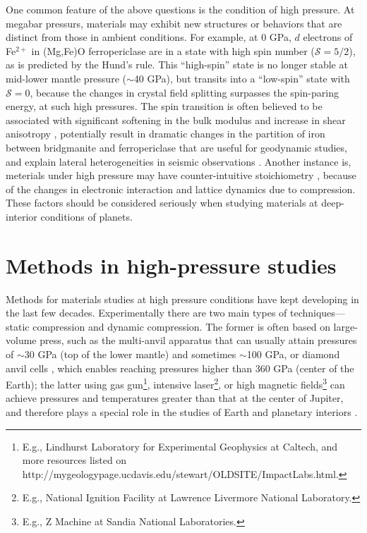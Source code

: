 One common feature of the above questions is the condition of high pressure. At megabar pressurs, materials may exhibit new structures or behaviors that are distinct from those in ambient conditions. For example, at 0 GPa, $d$ electrons of Fe$^{2+}$ in (Mg,Fe)O ferropericlase are in a state with high spin number ($\mathcal{S}=5/2$), as is predicted by the Hund's rule. This ``high-spin'' state is no longer stable at mid-lower mantle pressure ($\sim$40 GPa), but transits into a ``low-spin'' state with $\mathcal{S}=0$, because the changes in crystal field splitting surpasses the spin-paring energy, at such high pressures. The spin transition is often believed to be associated with significant softening in the bulk modulus \cite{Chen2012} and increase in shear anisotropy \cite{Marquardt2009}, potentially result in dramatic changes in the partition of iron between bridgmanite and ferropericlase \cite{Badro2003} that are useful for geodynamic studies, and explain lateral heterogeneities in seismic observations \cite{Wu2014}. Another instance is, meterials under high pressure may have counter-intuitive stoichiometry \cite{WZhang2013}, because of the changes in electronic interaction and lattice dynamics due to compression. These factors should be considered seriously when studying materials at deep-interior conditions of planets.

\section{Methods in high-pressure studies}
Methods for materials studies at high pressure conditions have kept developing in the last few decades. Experimentally there are two main types of techniques---static compression and dynamic compression. The former is often based on large-volume press, such as the multi-anvil apparatus \cite{Ito2015} that can usually attain pressures of $\sim$30 GPa (top of the lower mantle) and sometimes $\sim$100 GPa, or diamond anvil cells \cite{Mao2007}, which enables reaching pressures higher than 360 GPa (center of the Earth); the latter using gas gun\footnote{E.g., Lindhurst Laboratory for Experimental Geophysics at Caltech, and more resources listed on http://mygeologypage.ucdavis.edu/stewart/OLDSITE/ImpactLabs.html.}, intensive laser\footnote{E.g., National Ignition Facility at Lawrence Livermore National Laboratory.}, or high magnetic fields\footnote{E.g., Z Machine at  Sandia National Laboratories.} can achieve pressures and temperatures greater than that at the center of Jupiter, and therefore plays a special role in the studies of Earth and planetary interiors \cite{Ahrens2003}.

